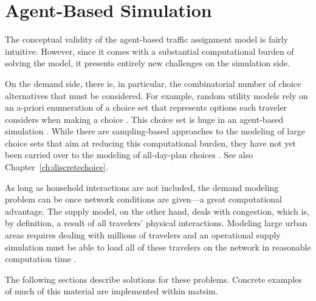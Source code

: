 
\section{Agent-Based Simulation}
\label{sec:agent-based-simul}

The conceptual validity of the agent-based traffic assignment model is fairly intuitive. 
However, since it comes with a substantial computational burden of solving the model, 
it presents entirely new challenges on the simulation side.

On the demand side, there is, in particular, the combinatorial number of choice alternatives that 
must be considered. For example, random utility models rely on an a-priori enumeration 
of a choice set that represents options each traveler considers when 
making a choice \citep[][]{BenAkivaLerman_1985}. This choice set is huge in an agent-based 
simulation \citep[][]{bowman-1998}. While there are sampling-based approaches to the modeling 
of large choice sets that aim at reducing this computational burden, they have not yet been 
carried over to the modeling of all-day-plan choices \citep[][]{BenAkivaLerman_1985, FrejingerEtAl_TransResB_2009, 
floetteroed-2012b}.
See also Chapter~\ref{ch:discretechoice}.

As long as household interactions are not included, the demand modeling problem can be 
 once  network
conditions are given---a great computational advantage.
The supply model, on the other hand, deals with congestion, which is, by definition, a result of all travelers' 
physical interactions. Modeling large urban areas requires dealing with millions
of travelers\corr{}{,} and an operational supply simulation must be able to
load all of these travelers on the network in reasonable computation time . 

The following sections describe solutions for these problems. Concrete examples
of much of this material are implemented within \gls{matsim}.


